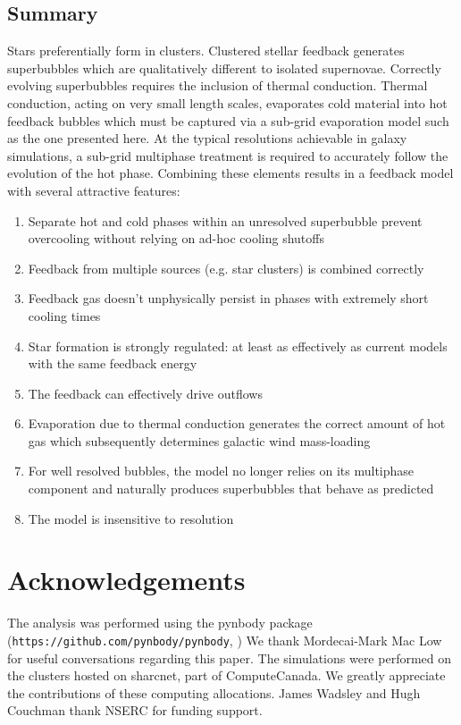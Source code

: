 \subsection{Summary}
Stars preferentially form in clusters.  Clustered stellar feedback generates
superbubbles which are qualitatively different to isolated supernovae.
Correctly evolving superbubbles requires the inclusion of thermal conduction.
Thermal conduction, acting on very small length scales, evaporates cold material
into hot feedback bubbles which must be captured via a sub-grid evaporation
model such as the one presented here.  At the typical resolutions achievable in
galaxy simulations, a sub-grid multiphase treatment is required to accurately
follow the evolution of the hot phase.  Combining these elements results in a
feedback model with several attractive features:

\begin{enumerate}
    \item Separate hot and cold phases within an unresolved superbubble prevent overcooling
        without relying on ad-hoc cooling shutoffs
    \item Feedback from multiple sources (e.g. star clusters) is combined correctly
    \item Feedback gas doesn't unphysically persist in phases with extremely short cooling times
    \item Star formation is strongly regulated: at least as effectively as current models with the same
           feedback energy
    \item The feedback can effectively drive outflows
    \item Evaporation due to thermal conduction
        generates the correct amount of hot gas which 
        subsequently determines galactic wind mass-loading
    \item For well resolved bubbles, the model no longer relies on its multiphase component 
         and naturally produces superbubbles that behave as predicted
    \item The model is insensitive to resolution
\end{enumerate}

\section*{Acknowledgements}
The analysis was performed using the pynbody package \\
(\texttt{https://github.com/pynbody/pynbody}, \citep{pynbody})
  We thank Mordecai-Mark Mac Low for useful
conversations regarding this paper.  The simulations were performed on the
clusters hosted on {\sc sharcnet}, part of ComputeCanada.  We greatly
appreciate the contributions of these computing allocations. James Wadsley and
Hugh Couchman thank NSERC for funding support.



